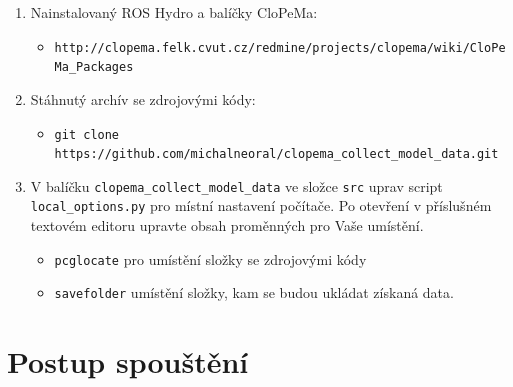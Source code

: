\documentclass[10pt,a4paper,titlepage,oneside]{report}
\begin{document}
\begin{enumerate}

   \item Nainstalovaný ROS Hydro a balíčky CloPeMa:
  \begin{itemize} 
  
  	\item \verb|http://clopema.felk.cvut.cz/redmine/projects/clopema/wiki/CloPeMa_Packages|
  \end{itemize}
  
  \item Stáhnutý archív se zdrojovými kódy:
  \begin{itemize}
  	\item \verb|git clone https://github.com/michalneoral/clopema_collect_model_data.git|
  \end{itemize}
  
  \item V balíčku \verb|clopema_collect_model_data| ve složce \verb|src| uprav script \verb|local_options.py| pro místní nastavení počítače. Po otevření v příslušném textovém editoru upravte obsah proměnných pro Vaše umístění. 
  \begin{itemize}
  	\item \verb|pcglocate| pro umístění složky se zdrojovými kódy
  	\item \verb|savefolder| umístění složky, kam se budou ukládat získaná data.
  \end{itemize}
\end{enumerate}


\section{Postup spouštění}
\label{sec:runScript}
\end{document}
